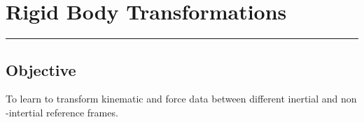 
\section{Rigid Body Transformations}
\hrule
\vspace{0.5cm}

\subsection*{Objective}
To learn to transform kinematic and force data between different inertial and non -intertial reference frames.



\newpage
